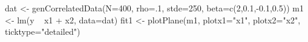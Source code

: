\begin{Schunk}
\begin{Sinput}
 dat <- genCorrelatedData(N=400, rho=.1, stde=250, beta=c(2,0.1,-0.1,0.5))
 m1 <- lm(y ~ x1 + x2, data=dat)
 fit1 <- plotPlane(m1, plotx1="x1", plotx2="x2", ticktype="detailed")
\end{Sinput}
\end{Schunk}

